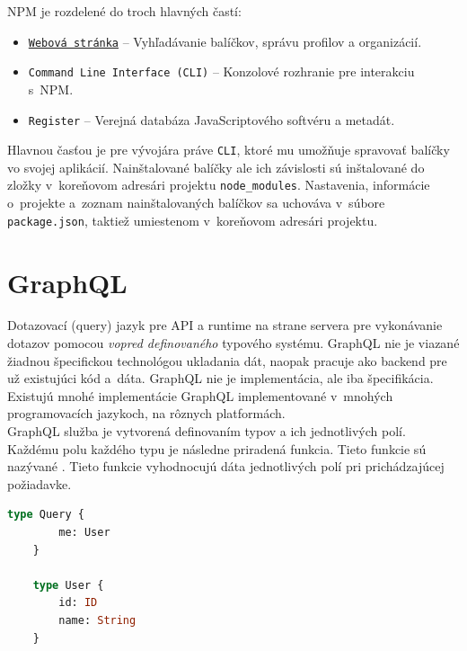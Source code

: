 \noindent NPM je rozdelené do troch hlavných častí:
\begin{itemize}
	\item \texttt{\href{https://npmjs.com/}{Webová stránka}} -- Vyhľadávanie balíčkov, správu profilov a organizácií. \cite{NPM}
	\item \texttt{Command Line Interface (CLI)} -- Konzolové rozhranie pre interakciu s~NPM. \cite{NPM}
	\item \texttt{Register} -- Verejná databáza JavaScriptového softvéru a metadát. \cite{NPM}
\end{itemize}

\noindent Hlavnou časťou je pre vývojára práve \texttt{CLI}, ktoré mu umožňuje spravovať balíčky vo svojej aplikácií. Nainštalované balíčky ale ich závislosti sú inštalované do zložky v~koreňovom adresári projektu \texttt{node\_modules}. Nastavenia, informácie o~projekte a~zoznam nainštalovaných balíčkov sa uchováva v~súbore \texttt{package.json}, taktiež umiestenom v~koreňovom adresári projektu.

\section{GraphQL}
\label{section:graphql}
Dotazovací (query) jazyk pre API a runtime na strane servera pre vykonávanie dotazov pomocou \emph{vopred definovaného} typového systému. GraphQL nie je viazané žiadnou špecifickou technológou ukladania dát, naopak pracuje ako backend pre už existujúci kód a~dáta. \cite{GraphQL} GraphQL nie je implementácia, ale iba špecifikácia. Existujú mnohé implementácie GraphQL implementované v~mnohých programovacích jazykoch, na rôznych platformách. \\

\noindent GraphQL služba je vytvorená definovaním typov a ich jednotlivých polí. Každému polu každého typu je následne priradená funkcia. \cite{GraphQL} Tieto funkcie sú nazývané . Tieto funkcie vyhodnocujú dáta jednotlivých polí pri prichádzajúcej požiadavke. \\

\begin{lstlisting}[label=lstlisting:graphql_schema, language=GraphQL, caption=Príklad jednoduchej GraphQL schémy. \cite{GraphQL}]
	type Query {
		me: User
	}

	type User {
		id: ID
		name: String
	}
\end{lstlisting}

\bigskip

